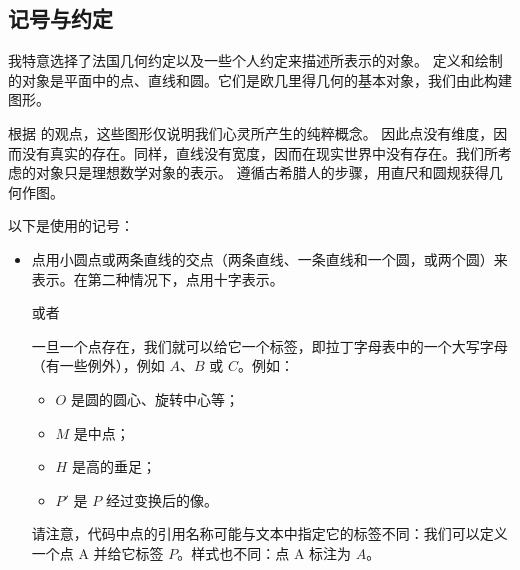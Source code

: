 \subsection{记号与约定}

我特意选择了法国几何约定以及一些个人约定来描述所表示的对象。\tkzname{\tkznameofpack} 定义和绘制的对象是平面中的点、直线和圆。它们是欧几里得几何的基本对象，我们由此构建图形。

根据  的观点，这些图形仅说明我们心灵所产生的纯粹概念。
因此点没有维度，因而没有真实的存在。同样，直线没有宽度，因而在现实世界中没有存在。我们所考虑的对象只是理想数学对象的表示。\tkzname{\tkznameofpack} 遵循古希腊人的步骤，用直尺和圆规获得几何作图。

以下是使用的记号：

\begin{itemize}
\item 点用小圆点或两条直线的交点（两条直线、一条直线和一个圆，或两个圆）来表示。在第二种情况下，点用十字表示。

\begin{tkzexample}[latex=6cm, small]     
\end{tkzexample}

或者

\begin{tkzexample}[latex=6cm, small]     
    \end{tkzexample}  

一旦一个点存在，我们就可以给它一个标签，即拉丁字母表中的一个大写字母（有一些例外），例如 $A$、$B$ 或 $C$。例如：
\begin{itemize}
\item $O$ 是圆的圆心、旋转中心等；
\item $M$ 是中点；
\item $H$ 是高的垂足；
\item $P'$ 是 $P$ 经过变换后的像。
\end{itemize}

请注意，代码中点的引用名称可能与文本中指定它的标签不同：我们可以定义一个点 A 并给它标签 $P$。样式也不同：点 A 标注为 $A$。


\end{itemize}
